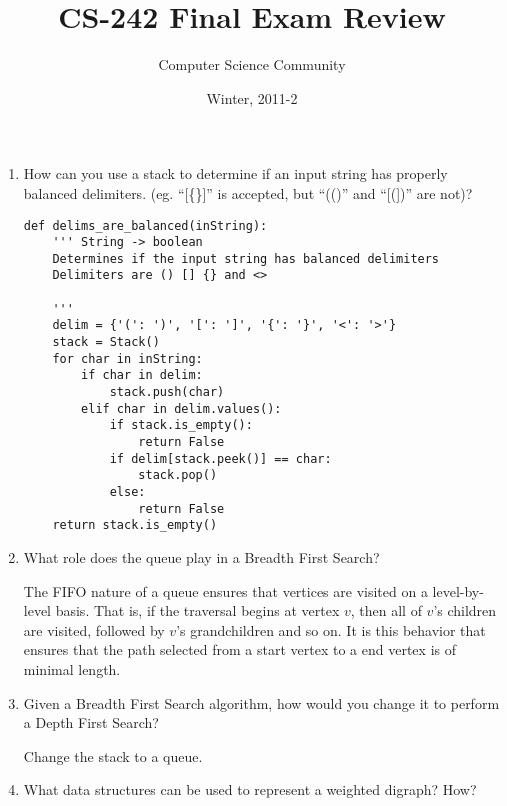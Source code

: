 \documentclass[11pt]{article}
\author{Computer Science Community}
\title{CS-242 Final Exam Review}
\date{Winter, 2011-2}
\makeatletter
\newenvironment{answer}{\large\lstset{basicstyle=\large}\color{white}}{}
\newenvironment{answer}{\large\lstset{basicstyle=\large}\color{red}}{}
\let\thetitle\@title
\let\thedate\@date
\makeatother
\begin{document}
\noindent{\Large \thetitle \hfill \thedate}

\begin{enumerate}

\item How can you use a stack to determine if an input string has
      properly balanced delimiters. (eg. ``[\{\}]'' is accepted, but ``(()''
      and ``[(])'' are not)?

    \begin{answer}
    \begin{lstlisting} 
def delims_are_balanced(inString):
    ''' String -> boolean
    Determines if the input string has balanced delimiters
    Delimiters are () [] {} and <>  
    
    '''
    delim = {'(': ')', '[': ']', '{': '}', '<': '>'}
    stack = Stack()
    for char in inString:
        if char in delim:
            stack.push(char)
        elif char in delim.values():
            if stack.is_empty():
                return False
            if delim[stack.peek()] == char:
                stack.pop()
            else:
                return False
    return stack.is_empty()
    \end{lstlisting}
    \end{answer}

\item What role does the queue play in a Breadth First Search?

    \begin{answer}
    The FIFO nature of a queue ensures that vertices are visited on a level-by-level basis. That is, if the traversal 
    begins at vertex $v$, then all of $v$'s children are visited, followed by $v$'s grandchildren and so on. It is
    this behavior that ensures that the path selected from a start vertex to a end vertex is of minimal length.
    \end{answer}

\item Given a Breadth First Search algorithm, how would you change it to
      perform a Depth First Search?

    \begin{answer}
    Change the stack to a queue.
    \end{answer}

\item What data structures can be used to represent a weighted  digraph? How?


\end{enumerate}
\end{document}
